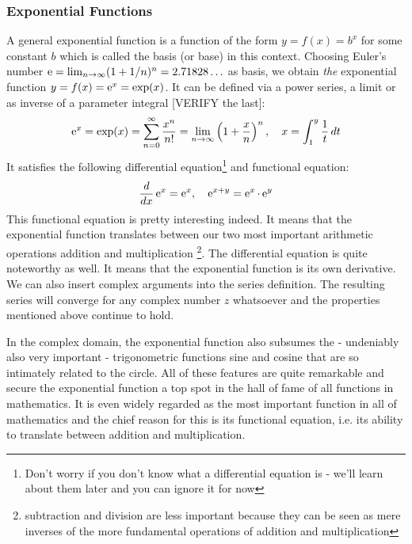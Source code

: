 \subsubsection{Exponential Functions}
A general exponential function is a function of the form $y = f(x) = b^x$ for some constant $b$ which is called the basis (or base) in this context. Choosing Euler's number $\operatorname{\mathrm{e}} = \lim_{n \rightarrow \infty} (1 + 1/n)^n = 2.71828\ldots$ as basis, we obtain \emph{the} exponential function $y = f(x) = \operatorname{\mathrm{e}}^x = \exp(x)$. It can be defined via a power series, a limit or as inverse of a parameter integral [VERIFY the last]:
\begin{equation}
\operatorname{\mathrm{e}}^x 
= \exp(x)
= \sum_{n=0}^{\infty} \frac{x^n}{n!}
= \lim_{n \rightarrow \infty} \left( 1 + \frac{x}{n} \right)^n, \quad
x = \int_1^y \frac{1}{t} \, dt
\end{equation}
It satisfies the following differential equation\footnote{Don't worry if you don't know what a differential equation is - we'll learn about them later and you can ignore it for now} and functional equation:
\begin{equation}
\frac{d}{dx} \operatorname{\mathrm{e}}^x = \operatorname{\mathrm{e}}^x, \quad
\operatorname{\mathrm{e}}^{x+y} = \operatorname{\mathrm{e}}^x \cdot \operatorname{\mathrm{e}}^y
\end{equation}
This functional equation is pretty interesting indeed. It means that the exponential function translates between our two most important arithmetic operations addition and multiplication \footnote{subtraction and division are less important because they can be seen as mere inverses of the more fundamental operations of addition and multiplication}. The differential equation is quite noteworthy as well. It means that the exponential function is its own derivative. We can also insert complex arguments into the series definition. The resulting series will converge for any complex number $z$ whatsoever and the properties mentioned above continue to hold.

\medskip
In the complex domain, the exponential function also subsumes the - undeniably also very important - trigonometric functions sine and cosine that are so intimately related to the circle. All of these features are quite remarkable and secure the exponential function a top spot in the hall of fame of all functions in mathematics. It is even widely regarded as the most important function in all of mathematics and the chief reason for this is its functional equation, i.e. its ability to translate between addition and multiplication.



